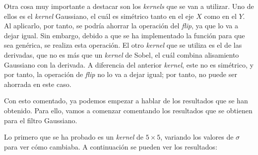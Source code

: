 \documentclass[11pt,a4paper]{article}
\begin{document}
Otra cosa muy importante a destacar son los \textit{kernels} que se van a utilizar. Uno de ellos es el \textit{kernel}
Gaussiano, el cuál es simétrico tanto en el eje $X$ como en el $Y$. Al aplicarlo, por tanto, se podría ahorrar la
operación del \textit{flip}, ya que lo va a dejar igual. Sin embargo, debido a que se ha implementado la función
para que sea genérica, se realiza esta operación. El otro \textit{kernel} que se utiliza es el de las derivadas,
que no es más que un \textit{kernel} de Sobel, el cuál combina alisamiento Gaussiano con la derivada.
A diferencia del anterior \textit{kernel}, este no es simétrico, y por tanto, la operación de
\textit{flip} no lo va a dejar igual; por tanto, no puede ser ahorrada en este caso.

Con esto comentado, ya podemos empezar a hablar de los resultados que se han obtenido. Para ello, vamos a comenzar
comentando los resultados que se obtienen para el filtro Gaussiano.

Lo primero que se ha probado es un \textit{kernel} de $5 \times 5$, variando los valores de $\sigma$ para ver cómo cambiaba.
A continuación se pueden ver los resultados:
\end{document}
